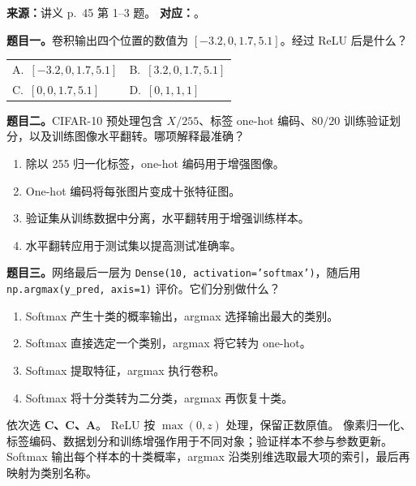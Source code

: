 \nopagebreak[4]

\textbf{来源：}讲义 p.~45 第 1--3 题。
\textbf{对应：}。

\textbf{题目一。}卷积输出四个位置的数值为 $[-3.2,0,1.7,5.1]$。经过 ReLU 后是什么？
\begin{center}
\begin{tabularx}{\linewidth}{@{}XX@{}}
  A.~$[-3.2,0,1.7,5.1]$ & B.~$[3.2,0,1.7,5.1]$ \\
  C.~$[0,0,1.7,5.1]$ & D.~$[0,1,1,1]$
\end{tabularx}
\end{center}

\textbf{题目二。}CIFAR-10 预处理包含 $X/255$、标签 one-hot 编码、$80/20$ 训练验证划分，以及训练图像水平翻转。哪项解释最准确？
\begin{enumerate}[label=\Alph*.,nosep]
  \item 除以 255 归一化标签，one-hot 编码用于增强图像。
  \item One-hot 编码将每张图片变成十张特征图。
  \item 验证集从训练数据中分离，水平翻转用于增强训练样本。
  \item 水平翻转应用于测试集以提高测试准确率。
\end{enumerate}

\textbf{题目三。}网络最后一层为
\texttt{Dense(10, activation='softmax')}，随后用
\texttt{np.argmax(y\_pred, axis=1)} 评价。它们分别做什么？
\begin{enumerate}[label=\Alph*.,nosep]
  \item Softmax 产生十类的概率输出，argmax 选择输出最大的类别。
  \item Softmax 直接选定一个类别，argmax 将它转为 one-hot。
  \item Softmax 提取特征，argmax 执行卷积。
  \item Softmax 将十分类转为二分类，argmax 再恢复十类。
\end{enumerate}

\begin{checkedsolution}
依次选 \textbf{C、C、A}。
ReLU 按 $\max(0,z)$ 处理，保留正数原值。
像素归一化、标签编码、数据划分和训练增强作用于不同对象；验证样本不参与参数更新。
Softmax 输出每个样本的十类概率，argmax 沿类别维选取最大项的索引，最后再映射为类别名称。
\end{checkedsolution}
